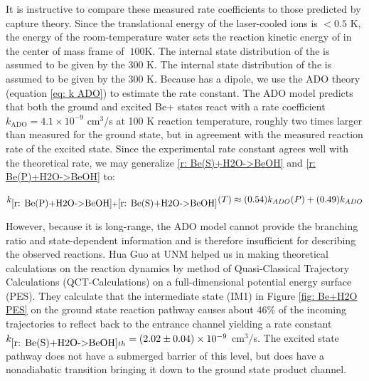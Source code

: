 It is instructive to compare these measured rate coefficients to those predicted by capture theory. Since the translational energy of the laser-cooled  ions is $<0.5$ K, the energy of the room-temperature water sets the reaction kinetic energy of  in the center of mass frame of $~100$K. The internal state distribution of the  is assumed to be given by the 300 K. The internal state distribution of the  is assumed to be given by the 300 K. Because  has a dipole, we use the ADO theory (equation \ref{eq: k ADO}) to estimate the rate constant. The ADO model predicts that both the ground and excited Be+ states react with a rate coefficient $k_{\text{ADO}} = 4.1 \times 10^{-9}$ cm$^3$/s at 100 K reaction temperature, roughly two times larger than measured for the ground state, but in agreement with the measured reaction rate of the excited state. Since the experimental rate constant agrees well with the theoretical rate, we may generalize \ref{r: Be(S)+H2O->BeOH} and \ref{r: Be(P)+H2O->BeOH} to:

\begin{equation}
	k_{\ref{r: Be(P)+H2O->BeOH}+\ref{r: Be(S)+H2O->BeOH}}(T) \approx (0.54)k_{ADO}(P) + (0.49)k_{ADO}
	\label{eq: k Be+H2O(T)}
\end{equation}

However, because it is long-range, the ADO model cannot provide the branching ratio and state-dependent information and is therefore insufficient for describing the observed reactions. Hua Guo at UNM helped us in making theoretical calculations on the reaction dynamics by method of Quasi-Classical Trajectory Calculations (QCT-Calculations) on a full-dimensional potential energy surface (PES).\cite{Yang2018} They calculate that the intermediate state (IM1) in Figure \ref{fig: Be+H2O PES} on the ground state reaction pathway causes about 46\% of the incoming trajectories to reflect back to the entrance channel yielding a rate constant $k_{\ref{r: Be(S)+H2O->BeOH} th} = (2.02 \pm 0.04) \times 10^{-9}$ cm$^3$/s. The excited state pathway does not have a submerged barrier of this level, but does have a nonadiabatic transition bringing it down to the ground state product channel.

